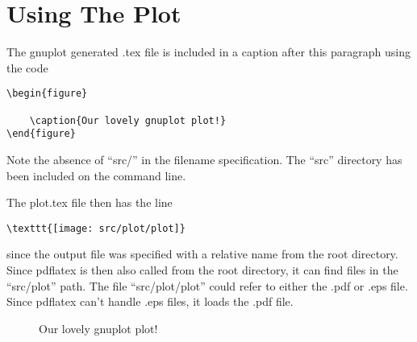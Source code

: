 \documentclass{article}
\begin{document}
\section{Using The Plot}

The gnuplot generated .tex file is included in a caption after this paragraph
using the code
%
\begin{verbatim}
\begin{figure}
    
    \caption{Our lovely gnuplot plot!}
\end{figure}
\end{verbatim}
%
Note the absence of ``src/'' in the filename specification.
The ``src'' directory has been included on the command line.


The plot.tex file then has the line
%
\begin{verbatim}
\texttt{[image: src/plot/plot]}
\end{verbatim}
%
since the output file was specified with a relative name from
the root directory.
Since pdflatex is then also called from the root directory, it can find
files in the ``src/plot'' path.
The file ``src/plot/plot'' could refer to either the .pdf or .eps file.
Since pdflatex can't handle .eps files, it loads the .pdf file.


\begin{figure}
    
    \caption{Our lovely gnuplot plot!}
\end{figure}
\end{document}
